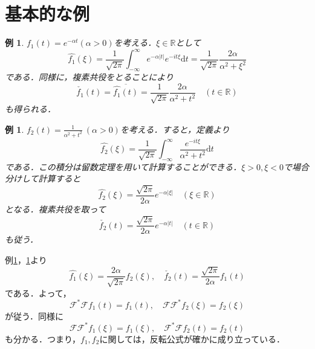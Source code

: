 \documentclass[a4j]{jsbook}
\newtheorem{example}[theorem]{例}
\numberwithin{theorem}{chapter}  %
\begin{document}
\section{基本的な例} \label{sec3-3}
\begin{example}
\label{ex3-1}
\(f_1(t)=e^{-\alpha t}(\alpha>0)\)を考える．\(\xi\in\mathbb{R}\)として
\begin{equation*}
    \hat{f_1}(\xi)=\frac{1}{\sqrt{2\pi}}\int_{-\infty}^\infty e^{-\alpha|t|}e^{-it\xi}\mathrm{d}t=\frac{1}{\sqrt{2\pi}}\frac{2\alpha}{\alpha^2+\xi^2}
\end{equation*}
である．同様に，複素共役をとることにより
\begin{equation*}
    \check{f_1}(t)=\overline{\hat{f_1}(t)}=\frac{1}{\sqrt{2\pi}}\frac{2\alpha}{\alpha^2+t^2}\quad (t\in\mathbb{R})
\end{equation*}
も得られる．
\end{example}
\begin{example}
\label{ex3-2}
\(\displaystyle f_2(t)=\frac{1}{\alpha^2+t^2}\ (\alpha>0)\)を考える．すると，定義より
\begin{equation*}
    \hat{f_2}(\xi)=\frac{1}{\sqrt{2\pi}}\int_{-\infty}^\infty\frac{e^{-it\xi}}{\alpha^2+t^2}\mathrm{d}t
\end{equation*}
である．この積分は留数定理を用いて計算することができる．\(\xi>0, \xi<0\)で場合分けして計算すると
\begin{equation*}
    \hat{f_2}(\xi)=\frac{\sqrt{2\pi}}{2\alpha}e^{-\alpha|\xi|}\quad(\xi\in\mathbb{R})
\end{equation*}
となる．複素共役を取って
\begin{equation*}
    \check{f_2}(t)=\frac{\sqrt{2\pi}}{2\alpha}e^{-\alpha|t|}\quad(t\in\mathbb{R})
\end{equation*}
も従う．
\end{example}
例\ref{ex3-1}，\ref{ex3-2}より
\begin{equation*}
    \hat{f_1}(\xi)=\frac{2\alpha}{\sqrt{2\pi}}f_2(\xi),\quad \check{f_2}(t)=\frac{\sqrt{2\pi}}{2\alpha}f_1(t)
\end{equation*}
である．よって，
\begin{equation*}
    \mathcal{F}^*\mathcal{F}f_1(t)=f_1(t),\quad \mathcal{F}\mathcal{F}^* f_2(\xi)=f_2(\xi)
\end{equation*}
が従う．同様に
\begin{equation*}
    \mathcal{F}\mathcal{F}^* f_1(\xi)=f_1(\xi),\quad \mathcal{F}^*\mathcal{F}f_2(t)=f_2(t)
\end{equation*}
も分かる．つまり，\(f_1, f_2\)に関しては，反転公式が確かに成り立っている．
\end{document}
